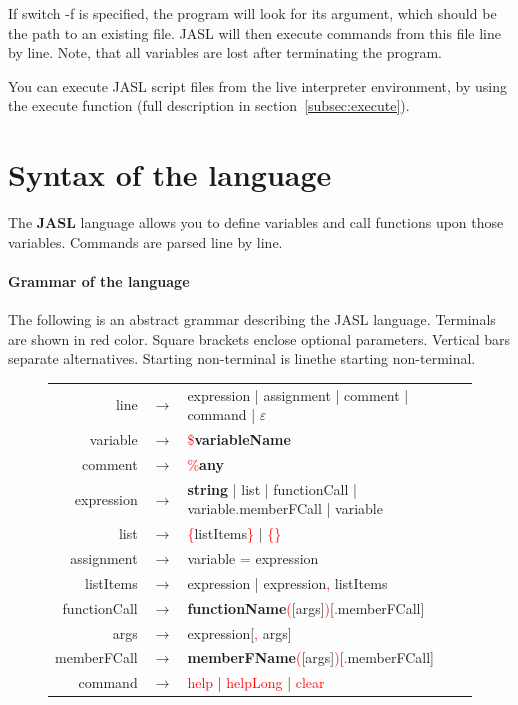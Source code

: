 \documentclass{ctuthesis}
\begin{document}
If switch -f is specified, the program will look for its argument, which should be the path to an existing file. JASL will then execute commands from this file line by line. Note, that all variables are lost after terminating the program. 

You can execute JASL script files from the live interpreter environment, by using the execute function (full description in section~\ref{subsec:execute}). 

\section{Syntax of the language}
\label{subsec:syntax}
The \textbf{JASL} language allows you to define variables and call functions upon those variables. Commands are parsed line by line.

\paragraph{Grammar of the language} The following is an abstract grammar describing the JASL language. Terminals are shown in red color. Square brackets enclose optional parameters. Vertical bars separate alternatives. Starting non-terminal is linethe starting non-terminal.

\begin{figure}[H]
\begin{ctucolortab}
\begin{tabular}{rcl}
	line &$\rightarrow$& expression | assignment | comment | command | $\varepsilon$ \\
	variable &$\rightarrow$& \textcolor{red}{\$}\textbf{variableName}\\
	comment &$\rightarrow$& \textcolor{red}{\%}\textbf{any} \\
	expression &$\rightarrow$& \textbf{string} | list | functionCall | variable\textcolor{red}{.}memberFCall | variable \\
	list &$\rightarrow$& \textcolor{red}{\{}listItems\textcolor{red}{\}} | \textcolor{red}{\{}\textcolor{red}{\}} \\
	assignment &$\rightarrow$& variable \textcolor{red}{ = } expression \\
	listItems &$\rightarrow$& expression | expression\textcolor{red}{,} listItems \\
	functionCall &$\rightarrow$& \textbf{functionName}\textcolor{red}{(}[args]\textcolor{red}{)}[\textcolor{red}{.}memberFCall] \\
	args &$\rightarrow$& expression[\textcolor{red}{,} args] \\
	memberFCall &$\rightarrow$& \textbf{memberFName}\textcolor{red}{(}[args]\textcolor{red}{)}[\textcolor{red}{.}memberFCall] \\
	command &$\rightarrow$& \textcolor{red}{help} | \textcolor{red}{helpLong} | \textcolor{red}{clear} 
\end{tabular}
\end{ctucolortab}
\end{figure}
\end{document}
